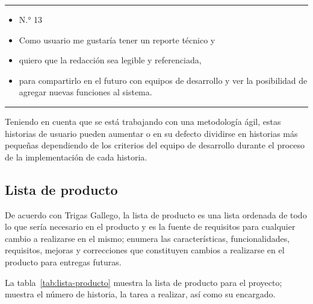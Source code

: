 \noindent\rule{\textwidth}{1pt}
\begin{itemize}
	\item N.° 13
	\item Como usuario me gustaría tener un reporte técnico y
	\item quiero que la redacción sea legible y referenciada,
	\item para compartirlo en el futuro con equipos de desarrollo y ver la posibilidad de agregar nuevas funciones al sistema.
\end{itemize}
\noindent\rule{\textwidth}{1pt}




Teniendo en cuenta que se está trabajando con una metodología ágil, estas historias de usuario pueden aumentar o en su defecto dividirse en historias más pequeñas dependiendo de los criterios del equipo de desarrollo durante el proceso de la implementación de cada historia.




\subsection{Lista de producto}

De acuerdo con Trigas Gallego\cite{gallego_metodologiscrum_2020}, la lista de producto es una lista ordenada de todo lo que sería necesario en el producto y es la fuente de requisitos para cualquier cambio a realizarse en el mismo; enumera las características, funcionalidades, requisitos, mejoras y correcciones que constituyen cambios a realizarse en el producto para entregas futuras.

La tabla~\ref{tab:lista-producto} muestra la lista de producto para el proyecto; muestra el número de historia, la tarea a realizar, así como su encargado.


